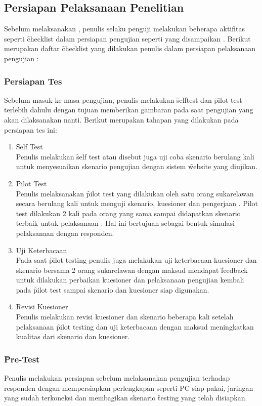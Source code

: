 \subsection{Persiapan Pelaksanaan Penelitian}
Sebelum melaksanakan \ust, penulis selaku penguji melakukan beberapa aktifitas seperti \f{checklist} dalam persiapan pengujian seperti yang disampaikan \citet{buku.rubin}. Berikut merupakan daftar \f{checklist} yang dilakukan penulis dalam persiapan pelaksanaan pengujian \citep{buku.rubin}:
\subsubsection{Persiapan Tes}
Sebelum masuk ke masa pengujian, penulis melakukan \f{selftest} dan \f{pilot test} terlebih dahulu dengan tujuan memberikan gambaran pada saat pengujian yang akan dilaksanakan nanti. Berikut merupakan tahapan yang dilakukan pada persiapan tes ini:
\begin{enumerate}
	\item \f{Self Test}\\
	Penulis melakukan \f{self test} atau disebut juga uji coba skenario \ust \space berulang kali untuk menyesuaikan skenario pengujian dengan sistem \f{website} yang diujikan.
	\item \f{Pilot Test}\\
	Penulis melaksanakan \f{pilot test} yang dilakukan oleh satu orang sukarelawan secara berulang kali untuk menguji skenario, kuesioner dan pengerjaan \ust. Pilot test dilakukan 2 kali pada orang yang sama sampai didapatkan skenario terbaik untuk pelaksanaan \ust. Hal ini bertujuan sebagai bentuk simulasi pelaksanaan \ust \space dengan responden.
	\item Uji Keterbacaan\\
	Pada saat \f{pilot testing} penulis juga melakukan uji keterbacaan kuesioner dan skenario bersama 2 orang sukarelawan dengan maksud mendapat \f{feedback} untuk dilakukan perbaikan kuesioner dan pelaksanaan pengujian kembali pada \f{pilot test} sampai skenario dan kuesioner siap digunakan.
	\item Revisi Kuesioner\\
	Penulis melakukan revisi kuesioner dan skenario beberapa kali setelah pelaksanaan \f{pilot testing} dan uji keterbacaan dengan maksud meningkatkan kualitas dari skenario dan kuesioner.
\end{enumerate}
\subsubsection{\f{Pre-Test}}
Penulis melakukan persiapan sebelum melaksanakan pengujian terhadap responden dengan mempersiapkan perlengkapan seperti PC siap pakai, jaringan yang sudah terkoneksi dan membagikan skenario \f{testing} yang telah disiapkan.
